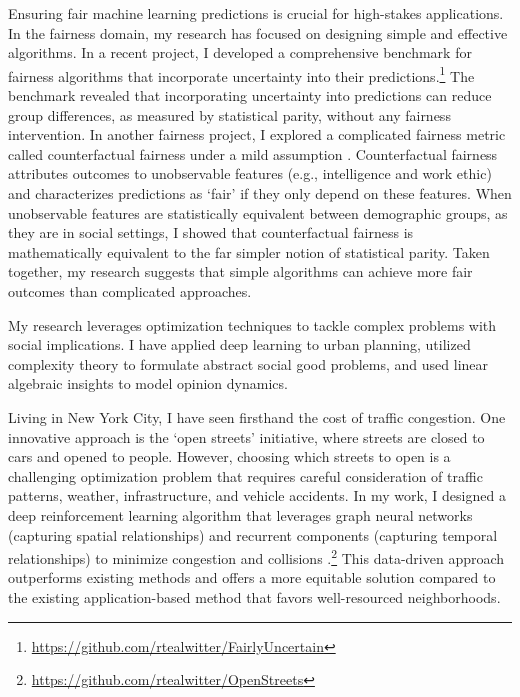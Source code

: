 \documentclass[11pt]{article}
\begin{document}
Ensuring fair machine learning predictions is crucial for high-stakes applications.
In the fairness domain, my research has focused on designing simple and effective algorithms.
In a recent project, I developed a comprehensive benchmark for fairness algorithms that incorporate uncertainty into their predictions.\footnote{\url{https://github.com/rtealwitter/FairlyUncertain}}
The benchmark revealed that incorporating uncertainty into predictions can reduce group differences, as measured by statistical parity, without any fairness intervention.
In another fairness project, I explored a complicated fairness metric called counterfactual fairness under a mild assumption \cite{rosenblatt2023counterfactual}.
Counterfactual fairness attributes outcomes to unobservable features (e.g., intelligence and work ethic) and characterizes predictions as `fair' if they only depend on these features.
When unobservable features are statistically equivalent between demographic groups, as they are in social settings, I showed that counterfactual fairness is mathematically equivalent to the far simpler notion of statistical parity.
Taken together, my research suggests that simple algorithms can achieve more fair outcomes than complicated approaches.


My research leverages optimization techniques to tackle complex problems with social implications.
I have applied deep learning to urban planning, utilized complexity theory to formulate abstract social good problems, and used linear algebraic insights to model opinion dynamics.

Living in New York City, I have seen firsthand the cost of traffic congestion.
One innovative approach is the `open streets' initiative, where streets are closed to cars and opened to people.
However, choosing which streets to open is a challenging optimization problem that requires careful consideration of traffic patterns, weather, infrastructure, and vehicle accidents.
In my work, I designed a deep reinforcement learning algorithm that leverages graph neural networks (capturing spatial relationships) and recurrent components (capturing temporal relationships) to minimize congestion and collisions \cite{witter2024i}.\footnote{\url{https://github.com/rtealwitter/OpenStreets}}
This data-driven approach outperforms existing methods and offers a more equitable solution compared to the existing application-based method that favors well-resourced neighborhoods.
\end{document}
